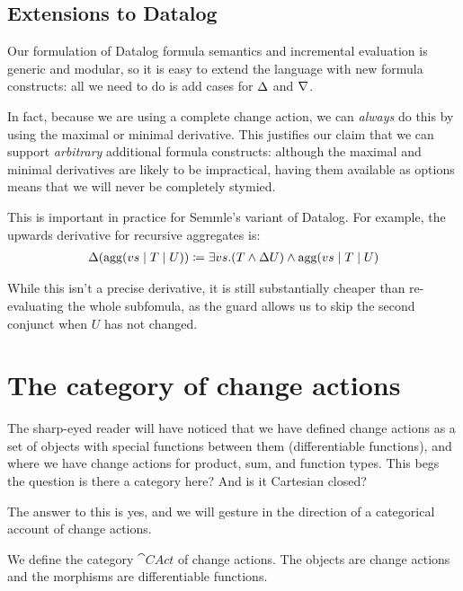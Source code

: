 \subsection{Extensions to Datalog}
\label{sec:extensions}

Our formulation of Datalog formula semantics and incremental evaluation is 
generic and modular, so it is easy to extend the language with new
formula constructs: all we need to do is add cases for $\Delta$ and $\nabla$.

In fact, because we are using a complete change action, we can \emph{always} do this by using the maximal or
minimal derivative. This justifies our claim that we can support
\emph{arbitrary} additional formula constructs: although the maximal and minimal
derivatives are likely to be impractical, having them
available as options means that we will never be completely stymied.

This is important in practice for Semmle's variant of Datalog. For example, the
upwards derivative for recursive aggregates \autocite{demoor2013aggregates} is:
\begin{align*}
  \Delta(\textrm{agg}(vs \mid T \mid U)) \coloneqq \exists vs. (T \wedge \Delta{U}) \wedge \textrm{agg}(vs \mid T \mid U)
\end{align*}

While this isn't a precise derivative, it is still substantially cheaper than
re-evaluating the whole subfomula, as the guard allows us to skip the second conjunct when $U$
has not changed.

\section{The category of change actions}
\label{sec:category}

The sharp-eyed reader will have noticed that we have defined change actions as a
set of objects with special functions between them (differentiable functions),
and where we have change actions for product, sum, and function types. This begs
the question \textemdash{} is there a category here? And is it Cartesian closed?

The answer to this is yes, and we will gesture in the direction of a categorical
account of change actions.

\begin{defn}
  We define the category $\cat{CAct}$ of change actions. The objects are
  change actions and the morphisms are differentiable functions. 
\end{defn}

